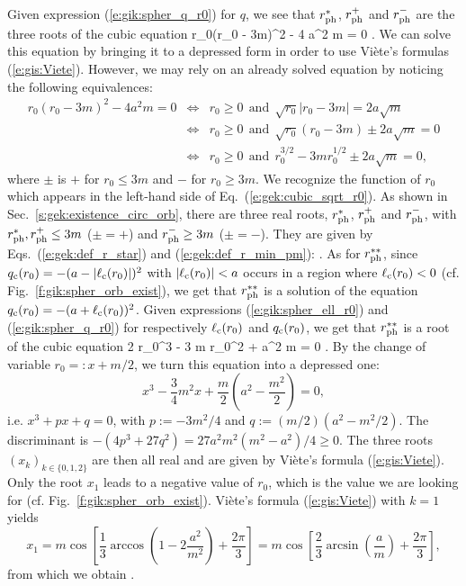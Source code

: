 Given expression (\ref{e:gik:spher_q_r0}) for $q$, we see that
$r_{\rm ph}^*$, $r_{\rm ph}^+$ and $r_{\rm ph}^-$
are the three roots of the cubic equation
\be
r_0(r_0 - 3m)^2 - 4 a^2 m  = 0 .
\ee
We can solve this equation by bringing it to a depressed form in order
to use Viète's formulas (\ref{e:gis:Viete}). However, we may rely on an
already solved equation by noticing the following equivalences:
\begin{eqnarray}
r_0(r_0 - 3m)^2 - 4 a^2 m  = 0  & \iff & r_0 \geq 0 \ \ \mbox{and} \ \
            \sqrt{r_0} | r_0 - 3 m | = 2 a\sqrt{m} \nonumber \\
& \iff &  r_0 \geq 0 \ \ \mbox{and} \ \
    \sqrt{r_0} (r_0 - 3 m ) \pm 2 a \sqrt{m} = 0 \nonumber \\
& \iff &  r_0 \geq 0 \ \ \mbox{and} \ \
    r_0^{3/2} - 3 m r_0^{1/2} \pm 2 a \sqrt{m} = 0 , \nonumber
\end{eqnarray}
where $\pm$ is $+$ for $r_0 \leq 3 m$ and $-$ for $r_0 \geq 3m$.
We recognize the function of $r_0$ which appears in the left-hand side
of Eq.~(\ref{e:gek:cubic_sqrt_r0}). As shown in Sec.~\ref{s:gek:existence_circ_orb},
there are three real roots,
$r_{\rm ph}^*$, $r_{\rm ph}^+$ and $r_{\rm ph}^-$, with
$r_{\rm ph}^*, r_{\rm ph}^+\leq 3m$ ($\pm = +$)
and $r_{\rm ph}^- \geq 3m$ ($\pm = -$). They are given by Eqs.~(\ref{e:gek:def_r_star})
and (\ref{e:gek:def_r_min_pm}):
\be \label{e:gik:rph_s}
    .
\ee
\be \label{e:gik:rph_pm}
   \encadre{ r_{\rm ph}^\pm := 4m\cos^2 \left[ \frac{1}{3} \arccos\left( \mp \frac{a}{m} \right) \right] }
\ee
As for $r_{\rm ph}^{**}$, since $q_{\rm c}(r_0) = - (a - |\ell_{\rm c}(r_0)|)^2$ with
$|\ell_{\rm c}(r_0)|  < a$ occurs in a region where $\ell_{\rm c}(r_0) < 0$ (cf. Fig.~\ref{f:gik:spher_orb_exist}),
we get that $r_{\rm ph}^{**}$ is a solution of the equation
$q_{\rm c}(r_0) = - (a + \ell_{\rm c}(r_0))^2$. Given expressions (\ref{e:gik:spher_ell_r0}) and (\ref{e:gik:spher_q_r0})
for respectively $\ell_{\rm c}(r_0)$ and $q_{\rm c}(r_0)$, we get that $r_{\rm ph}^{**}$ is a root of the cubic
equation
\be \label{e:gik:cubic_rph_ss}
    2 r_0^3 - 3 m r_0^2 + a^2 m = 0 .
\ee
By the change of variable $r_0 =: x + m/2$, we turn this equation into a depressed one:
\[
    x^3  - \frac{3}{4} m^2 x + \frac{m}{2} \left(a^2 - \frac{m^2}{2} \right) = 0 ,
\]
i.e. $x^3 + px + q = 0$, with $p:= -3m^2/4$ and $q:=(m/2)(a^2 - m^2/2)$.
The discriminant is $-(4 p^3 + 27 q^2) = 27 a^2 m^2 (m^2 - a^2)/4 \geq 0$. The three roots
$(x_k)_{k\in\{0,1,2\}}$ are then all real and are given by Viète's formula (\ref{e:gis:Viete}).
Only the root $x_1$ leads to a negative value of $r_0$, which is the value we
are looking for (cf. Fig.~\ref{f:gik:spher_orb_exist}). Viète's formula (\ref{e:gis:Viete})
with $k=1$ yields
\[
    x_1 = m \cos\left[ \frac{1}{3} \arccos\left(1 - 2 \frac{a^2}{m^2} \right) + \frac{2\pi}{3} \right]
        = m \cos\left[ \frac{2}{3} \arcsin\left(\frac{a}{m}\right) + \frac{2\pi}{3} \right] ,
\]
from which we obtain
\be \label{e:gik:rph_ss}
    .
\ee

